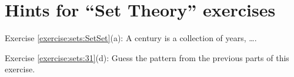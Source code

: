 \section{Hints for ``Set Theory'' exercises}
\label{sec:Sets:Hints}

\noindent Exercise \ref{exercise:sets:SetSet}(a): A century is a collection of years, \ldots.

\noindent Exercise \ref{exercise:sets:31}(d): Guess the pattern from the previous parts of this exercise.

